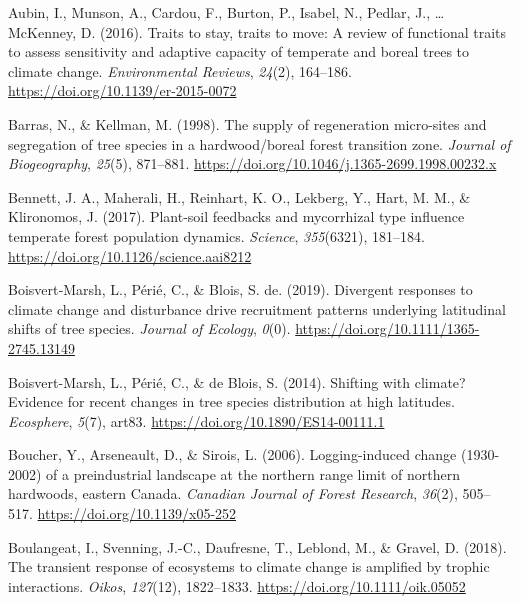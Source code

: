 \documentclass[a4paperpaper,]{article}
\begin{document}
\leavevmode\hypertarget{ref-aubin_traits_2016}{}%
Aubin, I., Munson, A., Cardou, F., Burton, P., Isabel, N., Pedlar, J.,
\ldots{} McKenney, D. (2016). Traits to stay, traits to move: A review
of functional traits to assess sensitivity and adaptive capacity of
temperate and boreal trees to climate change. \emph{Environmental
Reviews}, \emph{24}(2), 164--186.
\url{https://doi.org/10.1139/er-2015-0072}

\leavevmode\hypertarget{ref-barras_supply_1998}{}%
Barras, N., \& Kellman, M. (1998). The supply of regeneration
micro-sites and segregation of tree species in a hardwood/boreal forest
transition zone. \emph{Journal of Biogeography}, \emph{25}(5), 871--881.
\url{https://doi.org/10.1046/j.1365-2699.1998.00232.x}

\leavevmode\hypertarget{ref-bennett_plant-soil_2017}{}%
Bennett, J. A., Maherali, H., Reinhart, K. O., Lekberg, Y., Hart, M. M.,
\& Klironomos, J. (2017). Plant-soil feedbacks and mycorrhizal type
influence temperate forest population dynamics. \emph{Science},
\emph{355}(6321), 181--184.
\url{https://doi.org/10.1126/science.aai8212}

\leavevmode\hypertarget{ref-boisvertmarsh_divergent_2019}{}%
Boisvert‐Marsh, L., Périé, C., \& Blois, S. de. (2019). Divergent
responses to climate change and disturbance drive recruitment patterns
underlying latitudinal shifts of tree species. \emph{Journal of
Ecology}, \emph{0}(0). \url{https://doi.org/10.1111/1365-2745.13149}

\leavevmode\hypertarget{ref-boisvert-marsh_shifting_2014}{}%
Boisvert-Marsh, L., Périé, C., \& de Blois, S. (2014). Shifting with
climate? Evidence for recent changes in tree species distribution at
high latitudes. \emph{Ecosphere}, \emph{5}(7), art83.
\url{https://doi.org/10.1890/ES14-00111.1}

\leavevmode\hypertarget{ref-boucher_logging-induced_2006}{}%
Boucher, Y., Arseneault, D., \& Sirois, L. (2006). Logging-induced
change (1930-2002) of a preindustrial landscape at the northern range
limit of northern hardwoods, eastern Canada. \emph{Canadian Journal of
Forest Research}, \emph{36}(2), 505--517.
\url{https://doi.org/10.1139/x05-252}

\leavevmode\hypertarget{ref-boulangeat_transient_2018}{}%
Boulangeat, I., Svenning, J.-C., Daufresne, T., Leblond, M., \& Gravel,
D. (2018). The transient response of ecosystems to climate change is
amplified by trophic interactions. \emph{Oikos}, \emph{127}(12),
1822--1833. \url{https://doi.org/10.1111/oik.05052}
\end{document}

